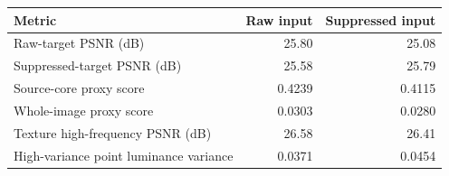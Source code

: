 \begin{tabular}{lrr}
\toprule
Metric & Raw input & Suppressed input \\
\midrule
Raw-target PSNR (dB) & 25.80 & 25.08 \\
Suppressed-target PSNR (dB) & 25.58 & 25.79 \\
Source-core proxy score & 0.4239 & 0.4115 \\
Whole-image proxy score & 0.0303 & 0.0280 \\
Texture high-frequency PSNR (dB) & 26.58 & 26.41 \\
High-variance point luminance variance & 0.0371 & 0.0454 \\
\bottomrule
\end{tabular}
